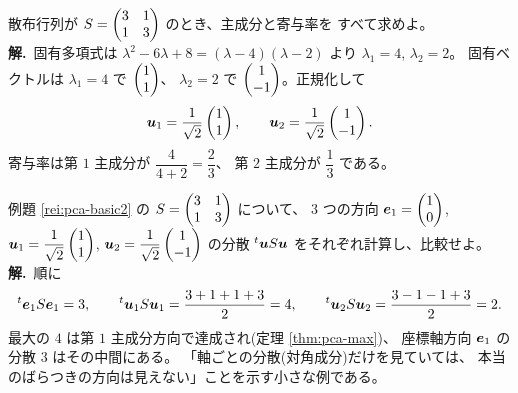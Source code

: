 \begin{rei}[例題・基本(主成分と寄与率)]\label{rei:pca-basic2}
散布行列が $S = \begin{pmatrix}3 & 1 \\ 1 & 3\end{pmatrix}$ のとき、主成分と寄与率を
すべて求めよ。\\
\textbf{解.}\ 固有多項式は $\lambda^2 - 6\lambda + 8
= (\lambda - 4)(\lambda - 2)$ より $\lambda_1 = 4$, $\lambda_2 = 2$。
固有ベクトルは $\lambda_1 = 4$ で $\begin{pmatrix}1 \\ 1\end{pmatrix}$、
$\lambda_2 = 2$ で $\begin{pmatrix}1 \\ -1\end{pmatrix}$。正規化して
\[
\bm{u}_1 = \frac{1}{\sqrt{2}}\begin{pmatrix}1 \\ 1\end{pmatrix}, \qquad
\bm{u}_2 = \frac{1}{\sqrt{2}}\begin{pmatrix}1 \\ -1\end{pmatrix}.
\]
寄与率は第 $1$ 主成分が $\dfrac{4}{4 + 2} = \dfrac{2}{3}$、
第 $2$ 主成分が $\dfrac{1}{3}$ である。
\end{rei}

\begin{rei}[例題・基本(方向ごとの分散)]\label{rei:pca-basic3}
例題 \ref{rei:pca-basic2} の $S = \begin{pmatrix}3 & 1 \\ 1 & 3\end{pmatrix}$ について、
$3$ つの方向
$\bm{e}_1 = \begin{pmatrix}1 \\ 0\end{pmatrix}$,
$\bm{u}_1 = \dfrac{1}{\sqrt{2}}\begin{pmatrix}1 \\ 1\end{pmatrix}$,
$\bm{u}_2 = \dfrac{1}{\sqrt{2}}\begin{pmatrix}1 \\ -1\end{pmatrix}$
の分散 ${}^t\bm{u}S\bm{u}$ をそれぞれ計算し、比較せよ。\\
\textbf{解.}\ 順に
\[
{}^t\bm{e}_1 S\bm{e}_1 = 3, \qquad
{}^t\bm{u}_1 S\bm{u}_1 = \frac{3 + 1 + 1 + 3}{2} = 4, \qquad
{}^t\bm{u}_2 S\bm{u}_2 = \frac{3 - 1 - 1 + 3}{2} = 2.
\]
最大の $4$ は第 $1$ 主成分方向で達成され(定理 \ref{thm:pca-max})、
座標軸方向 $\bm{e}_1$ の分散 $3$ はその中間にある。
「軸ごとの分散(対角成分)だけを見ていては、
本当のばらつきの方向は見えない」ことを示す小さな例である。
\end{rei}


